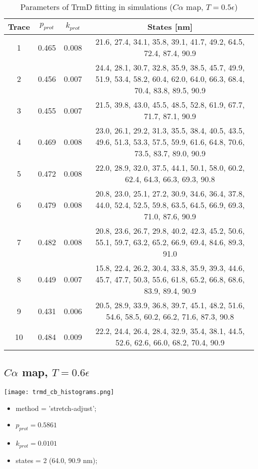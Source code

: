 \begin{table}
    \tiny
    \centering
    \caption{Parameters of TrmD fitting in simulations ($C\alpha$ map, $T=0.5\epsilon$)}
    \label{tab:trmd-ca-parameters}
    \begin{tabular}{c|c|c|c}
        \textbf{Trace} & \textbf{$p_{prot}$} & \textbf{$k_{prot}$} & \textbf{States [nm]}\\\hline
        1 & 0.465 & 0.008 & 21.6, 27.4, 34.1, 35.8, 39.1, 41.7, 49.2, 64.5, 72.4, 87.4, 90.9\\
        2 & 0.456 & 0.007 & 24.4, 28.1, 30.7, 32.8, 35.9, 38.5, 45.7, 49.9, 51.9, 53.4, 58.2, 60.4, 62.0, 64.0, 66.3, 68.4, 70.4, 83.8, 89.5, 90.9\\
        3 & 0.455 & 0.007 & 21.5, 39.8, 43.0, 45.5, 48.5, 52.8, 61.9, 67.7, 71.7, 87.1, 90.9\\
        4 & 0.469 & 0.008 & 23.0, 26.1, 29.2, 31.3, 35.5, 38.4, 40.5, 43.5, 49.6, 51.3, 53.3, 57.5, 59.9, 61.6, 64.8, 70.6, 73.5, 83.7, 89.0, 90.9\\
        5 & 0.472 & 0.008 & 22.0, 28.9, 32.0, 37.5, 44.1, 50.1, 58.0, 60.2, 62.4, 64.3, 66.3, 69.3, 90.8\\
        6 & 0.479 & 0.008 & 20.8, 23.0, 25.1, 27.2, 30.9, 34.6, 36.4, 37.8, 44.0, 52.4, 52.5, 59.8, 63.5, 64.5, 66.9, 69.3, 71.0, 87.6, 90.9\\
        7 & 0.482 & 0.008 & 20.8, 23.6, 26.7, 29.8, 40.2, 42.3, 45.2, 50.6, 55.1, 59.7, 63.2, 65.2, 66.9, 69.4, 84.6, 89.3, 91.0\\
        8 & 0.449 & 0.007 & 15.8, 22.4, 26.2, 30.4, 33.8, 35.9, 39.3, 44.6, 45.7, 47.7, 50.3, 55.6, 61.8, 65.2, 66.8, 68.6, 83.9, 89.4, 90.9\\
        9 & 0.431 & 0.006 & 20.5, 28.9, 33.9, 36.8, 39.7, 45.1, 48.2, 51.6, 54.6, 58.5, 60.2, 66.2, 71.6, 87.3, 90.8\\
        10 & 0.484 & 0.009 & 22.2, 24.4, 26.4, 28.4, 32.9, 35.4, 38.1, 44.5, 52.6, 62.6, 66.0, 68.2, 70.4, 90.9\\\hline
    \end{tabular}
\end{table}

\subsection{$C\alpha$ map, $T=0.6\epsilon$}
\label{subsec:trmd-cb}
\begin{minipage}[c]{0.7\textwidth}
    \texttt{[image: trmd\_cb\_histograms.png]}
\end{minipage}
\hfill
\begin{minipage}[c]{0.45\textwidth}
    \begin{itemize}
        \item method = 'stretch-adjust';
        \item $p_{prot}=0.5861$
        \item $k_{prot}=0.0101$
        \item states = 2 (64.0, 90.9 nm);
    \end{itemize}
\end{minipage}

